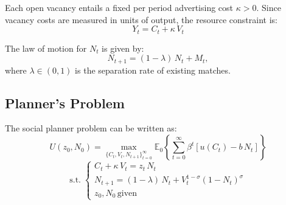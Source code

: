 \documentclass[dvipsnames,11pt]{article}
\begin{document}
    Each open vacancy entails a fixed per period advertising cost $\kappa > 0$. Since vacancy costs are measured in units of output, the resource constraint is:
    $$ Y_t = C_t + \kappa\,V_t $$
    
    The law of motion for $N_t$ is given by:
    \begin{equation}\label{eq:LoM}
        N_{t+1} = (1-\lambda)\,N_t + M_t,
    \end{equation}  
    where $\lambda \in (0,1)$ is the separation rate of existing matches.

    \subsection{Planner's Problem}
        
        The social planner problem can  be written as:
        $$ U(z_0,N_0) = \max_{\{C_t,V_t,N_{t+1}\}_{t=0}^\infty}\mathbb{E}_0\left\{\sum_{t=0}^\infty \beta^t \left[u(C_t) - b\,N_t\right]\right\} $$
        $$ \mathrm{s.t.}\; 
        \begin{cases}
        C_t + \kappa\,V_t = z_t\,N_t 	\\
        N_{t+1} = (1-\lambda)\,N_t + V_t^{1-\sigma}(1-N_t)^\sigma	\\
        z_0,N_0\,\text{given}
        \end{cases}
        $$
\end{document}

